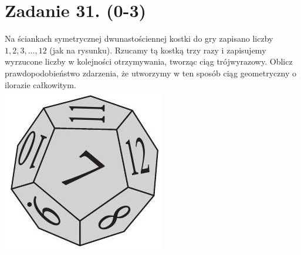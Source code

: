 \documentclass[10pt]{article}
\begin{document}
\section*{Zadanie 31. (0-3)}
Na ściankach symetrycznej dwunastościennej kostki do gry zapisano liczby \(1,2,3, \ldots, 12\) (jak na rysunku). Rzucamy tą kostką trzy razy i zapisujemy wyrzucone liczby w kolejności otrzymywania, tworząc ciąg trójwyrazowy. Oblicz prawdopodobieństwo zdarzenia, że utworzymy w ten sposób ciąg geometryczny o ilorazie całkowitym.\\
\includegraphics[max width=\textwidth, center]{2024_11_21_1e89351873aa60c4c1b9g-15}
\end{document}
